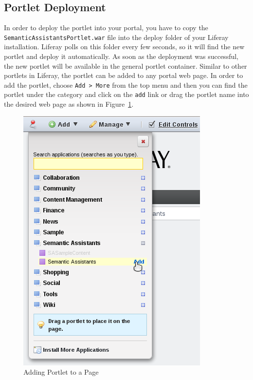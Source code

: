 \subsection{\sa Portlet Deployment}
In order to deploy the \sa portlet into your portal, you have to copy the \texttt{SemanticAssistantsPortlet.war} file into the deploy folder of your Liferay installation. Liferay polls on this folder every few seconds, so it will find the new portlet and deploy it automatically. As soon as the deployment was successful, the new portlet will be available in the general portlet container. Similar to other portlets in Liferay, the \sa portlet can be added to any portal web page. In order to add the \sa portlet, choose \texttt{Add \textgreater~More} from the top menu and then you can find the portlet under the \sa category and click on the \texttt{add} link or drag the portlet name into the desired web page as shown in Figure~\ref{fig:liferay_add_portlet}.

\begin{figure}
\centering
\includegraphics[scale=0.6]{pictures/liferay_add_portlet.png}
\caption{Adding \sa Portlet to a Page}
\label{fig:liferay_add_portlet}
\end{figure}

